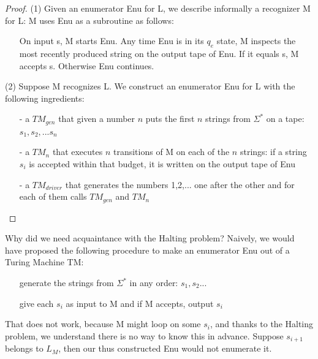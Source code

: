\begin{proof}
(1) Given an enumerator Enu for L, we describe informally a recognizer
  M for L: M uses Enu as a subroutine as follows:
\begin{itemize}
\item[]
On input s, M starts Enu. Any time Enu is in its $q_e$ state, M
inspects the most recently produced string on the output tape of
Enu. If it equals s, M accepts s. Otherwise Enu continues.
\end{itemize}

(2) Suppose M recognizes L. We construct an enumerator Enu for L with the following ingredients:

\begin{itemize}
\item[-] 
a $TM_{gen}$ that given a number $n$ puts the first $n$
strings from $\Sigma^*$ on a tape: $s_1, s_2, ... s_n$

\item[-]
a $TM_n$ that executes $n$ transitions
of M on each of the $n$ strings: if a string $s_i$ is accepted within that budget, it is written
on the output tape of Enu

\item[-]
a $TM_{driver}$ that generates the numbers 1,2,... one after the
other and for each of them calls $TM_{gen}$ and $TM_n$

\end{itemize}

\end{proof}

Why did we need acquaintance with the Halting problem? Naively, we
would have proposed the following procedure to make an enumerator Enu
out of a Turing Machine TM:

\begin{itemize}
\item[]
generate the strings from $\Sigma^*$ in any order:
$s_1, s_2...$

\item[]
give each $s_i$ as input to M and if M accepts, output $s_i$
\end{itemize}

That does not work, because M might loop on some $s_i$, and thanks to
the Halting problem, we understand there is no way to know this in
advance. Suppose $s_{i+1}$ belongs to $L_M$, then our thus constructed
Enu would not enumerate it.


